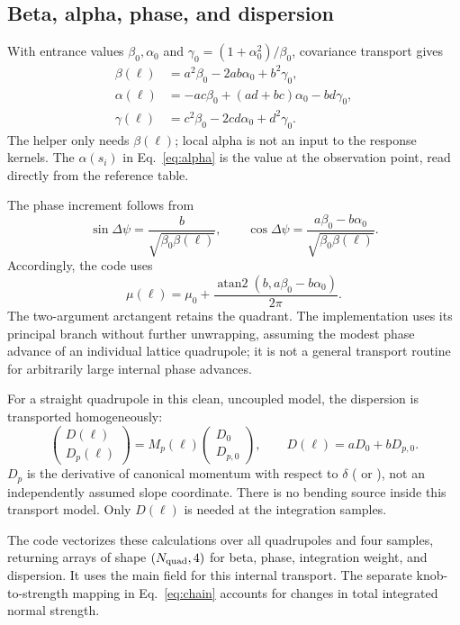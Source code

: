 \documentclass[11pt,a4paper]{article}
\newcommand{\code}[1]{\texttt{\detokenize{#1}}}
\DeclareMathOperator{\atanTwo}{atan2}
\begin{document}
\subsection{Beta, alpha, phase, and dispersion}

With entrance values $\beta_0,\alpha_0$ and
$\gamma_0=(1+\alpha_0^2)/\beta_0$, covariance transport gives
\begin{align}
 \beta(\ell)&=a^2\beta_0-2ab\alpha_0+b^2\gamma_0,\\
 \alpha(\ell)&=-ac\beta_0+(ad+bc)\alpha_0-bd\gamma_0,\\
 \gamma(\ell)&=c^2\beta_0-2cd\alpha_0+d^2\gamma_0.
\end{align}
The helper only needs $\beta(\ell)$; local alpha is not an input to the
response kernels. The $\alpha(s_i)$ in Eq.~\eqref{eq:alpha} is the value
at the observation point, read directly from the reference table.

The phase increment follows from
\begin{equation}
 \sin\Delta\psi=\frac{b}{\sqrt{\beta_0\beta(\ell)}},\qquad
 \cos\Delta\psi=\frac{a\beta_0-b\alpha_0}
                         {\sqrt{\beta_0\beta(\ell)}}.
\end{equation}
Accordingly, the code uses
\begin{equation}
 \mu(\ell)=\mu_0+
 \frac{\atanTwo(b,a\beta_0-b\alpha_0)}{2\pi}.
\end{equation}
The two-argument arctangent retains the quadrant. The implementation uses
its principal branch without further unwrapping, assuming the modest phase
advance of an individual lattice quadrupole; it is not a general transport
routine for arbitrarily large internal phase advances.

For a straight quadrupole in this clean, uncoupled model, the dispersion is
transported homogeneously:
\begin{equation}
 \begin{pmatrix}D(\ell)\\D_p(\ell)\end{pmatrix}
 =M_p(\ell)\begin{pmatrix}D_0\\D_{p,0}\end{pmatrix},\qquad
 D(\ell)=aD_0+bD_{p,0}.
\end{equation}
$D_p$ is the derivative of canonical momentum with respect to $\delta$
(\code{dpx} or \code{dpy}), not an independently assumed slope coordinate.
There is no bending source inside this transport model. Only $D(\ell)$ is
needed at the integration samples.

The code vectorizes these calculations over all quadrupoles and four samples,
returning arrays of shape $(N_{\rm quad},4)$ for beta, phase, integration
weight, and dispersion. It uses the main \code{k1} field for this internal
transport. The separate knob-to-strength mapping in Eq.~\eqref{eq:chain}
accounts for changes in total integrated normal strength.
\end{document}
